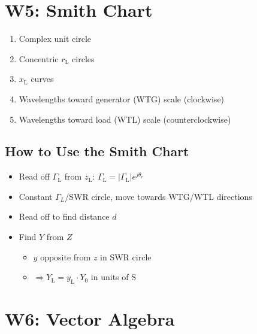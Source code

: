 \documentclass[a4paper]{article}
\begin{document}
\newpage
\section{W5: Smith Chart}
\begin{enumerate}
    \item Complex unit circle
    \item Concentric $r_\text{L}$ circles
    \item $x_\text{L}$ curves
    \item Wavelengths toward generator (WTG) scale \quad (clockwise)
    \item Wavelengths toward load (WTL) scale \quad (counterclockwise)
\end{enumerate}

\subsection{How to Use the Smith Chart}
\begin{itemize}
    \item Read off $\Gamma_\text{L}$ from $z_\text{L}$: $\Gamma_\text{L} = |\Gamma_\text{L}|e^{j\theta_r}$
    \item Constant $\Gamma_L$/SWR circle, move towards WTG/WTL directions
    \item Read off to find distance $d$
    \item Find $Y$ from $Z$
    \begin{itemize}[label=$\circ$]
        \item $y$ opposite from $z$ in SWR circle
        \item $\Rightarrow Y_\text{L} = y_\text{L}\cdot Y_0$ in units of S
    \end{itemize}
\end{itemize}

\newpage
\section{W6: Vector Algebra}
\end{document}
